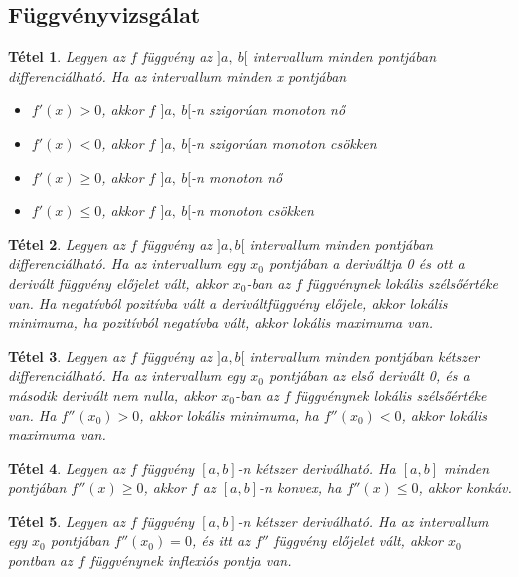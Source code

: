 \documentclass[twoside,12pt]{report}
\newtheorem{theorem}{Tétel}[section]
\theoremstyle{definition}
\begin{document}
	\subsection{Függvényvizsgálat}
	\begin{theorem}
		Legyen az $f$ függvény az $]a,\ b[$ intervallum minden pontjában differenciálható. Ha az intervallum minden x pontjában
		\begin{itemize}
			\item $f'(x)>0$, akkor $f$ $]a,\ b[$-n szigorúan monoton nő
			\item $f'(x)<0$, akkor $f$ $]a,\ b[$-n szigorúan monoton csökken
			\item $f'(x)\ge0$, akkor $f$ $]a,\ b[$-n monoton nő
			\item $f'(x)\le0$, akkor $f$ $]a,\ b[$-n monoton csökken
		\end{itemize}
	\end{theorem}
	\begin{theorem}
		Legyen az $f$ függvény az $]a,b[$ intervallum minden pontjában differenciálható. Ha az intervallum egy $x_0$ pontjában a deriváltja 0 és ott a derivált függvény előjelet vált, akkor $x_0$-ban az $f$ függvénynek lokális szélsőértéke van. Ha negatívból pozitívba vált a deriváltfüggvény előjele, akkor lokális minimuma, ha pozitívból negatívba vált, akkor lokális maximuma van.
	\end{theorem}
	\begin{theorem}
		Legyen az $f$ függvény az $]a,b[$ intervallum minden pontjában kétszer differenciálható. Ha az intervallum egy $x_0$ pontjában az első derivált 0, és a második derivált nem nulla, akkor $x_0$-ban az $f$ függvénynek lokális szélsőértéke van. Ha $f''(x_0)>0$, akkor lokális minimuma, ha $f''(x_0)<0$, akkor lokális maximuma van.
	\end{theorem}
	\begin{theorem}
		Legyen az $f$ függvény $[a,b]$-n kétszer deriválható. Ha $[a,b]$ minden pontjában $f''(x)\ge0$, akkor $f$ az $[a,b]$-n konvex, ha $f''(x)\le0$, akkor konkáv.
	\end{theorem}
	\begin{theorem}
		Legyen az $f$ függvény $[a,b]$-n kétszer deriválható. Ha az intervallum egy $x_0$ pontjában $f''(x_0)=0$, és itt az $f''$ függvény előjelet vált, akkor $x_0$ pontban az $f$ függvénynek inflexiós pontja van.
	\end{theorem}
\end{document}
